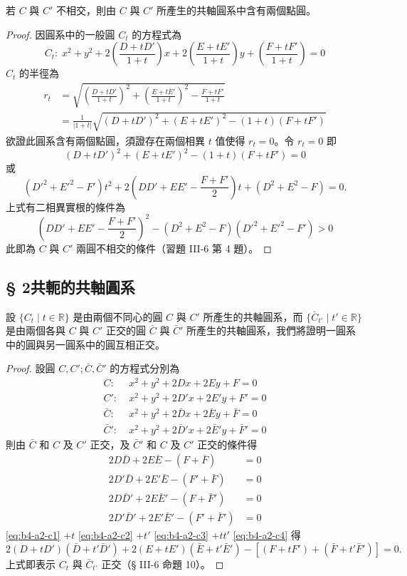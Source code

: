 \begin{prop}
若 $C$ 與 $C'$ 不相交，則由 $C$ 與 $C'$ 所產生的共軸圓系中含有兩個點圓。
\end{prop}

\begin{proof}
因圓系中的一般圓 $C_t$ 的方程式為
\[
C_t:\; x^2+y^2+2\left(\frac{D+tD'}{1+t}\right)x + 2\left(\frac{E+tE'}{1+t}\right)y + \left(\frac{F+tF'}{1+t}\right) = 0
\]
$C_t$ 的半徑為
\begin{align*}
r_t &= \sqrt{\left(\frac{D+tD'}{1+t}\right)^2 + \left(\frac{E+tE'}{1+t}\right)^2 - \frac{F+tF'}{1+t}} \\
&= \frac{1}{|1+t|} \sqrt{(D+tD')^2 + (E+tE')^2 - (1+t)(F+tF')}
\end{align*}
欲證此圓系含有兩個點圓，須證存在兩個相異 $t$ 值使得 $r_t = 0$。令 $r_t = 0$ 即
\[
(D+tD')^2 + (E+tE')^2 - (1+t)(F+tF') = 0
\]
或
\[
({D'}^2+{E'}^2-F')t^2 + 2\left(DD'+EE'-\frac{F+F'}{2}\right)t + (D^2+E^2-F) = 0.
\]
上式有二相異實根的條件為
\[
\left(DD'+EE'-\frac{F+F'}{2}\right)^2 - (D^2+E^2-F)({D'}^2+{E'}^2-F') > 0
\]
此即為 $C$ 與 $C'$ 兩圓不相交的條件（習題 III-6 第 4 題）。
\end{proof}

\subsection*{§ 2\quad 共軛的共軸圓系}

設 $\{C_t \mid t \in \mathbb{R}\}$ 是由兩個不同心的圓 $C$ 與 $C'$ 所產生的共軸圓系，而 $\{\bar{C}_{t'} \mid t' \in \mathbb{R}\}$ 是由兩個各與 $C$ 與 $C'$ 正交的圓 $\bar{C}$ 與 $\bar{C}'$ 所產生的共軸圓系，我們將證明一圓系中的圓與另一圓系中的圓互相正交。

\begin{proof}
設圓 $C, C'; \bar{C}, \bar{C}'$ 的方程式分別為
\begin{align*}
C:&\; x^2+y^2+2Dx+2Ey+F=0 \\
C':&\; x^2+y^2+2D'x+2E'y+F'=0 \\
\bar{C}:&\; x^2+y^2+2\bar{D}x+2\bar{E}y+\bar{F}=0 \\
\bar{C}':&\; x^2+y^2+2\bar{D}'x+2\bar{E}'y+\bar{F}'=0
\end{align*}
則由 $\bar{C}$ 和 $C$ 及 $C'$ 正交，及 $\bar{C}'$ 和 $C$ 及 $C'$ 正交的條件得
\begin{align}
2D\bar{D} + 2E\bar{E} - (F+\bar{F}) &= 0 \label{eq:b4-a2-c1} \\
2D'\bar{D} + 2E'\bar{E} - (F'+\bar{F}) &= 0 \label{eq:b4-a2-c2} \\
2D\bar{D}' + 2E\bar{E}' - (F+\bar{F}') &= 0 \label{eq:b4-a2-c3} \\
2D'\bar{D}' + 2E'\bar{E}' - (F'+\bar{F}') &= 0 \label{eq:b4-a2-c4}
\end{align}
\eqref{eq:b4-a2-c1} $+ t$ \eqref{eq:b4-a2-c2} $+ t'$ \eqref{eq:b4-a2-c3} $+ tt'$ \eqref{eq:b4-a2-c4} 得
\[
2(D+tD')(\bar{D}+t'\bar{D}') + 2(E+tE')(\bar{E}+t'\bar{E}') - [(F+tF')+(\bar{F}+t'\bar{F}')] = 0.
\]
上式即表示 $C_t$ 與 $\bar{C}_{t'}$ 正交（§ III-6 命題 10）。
\end{proof}


